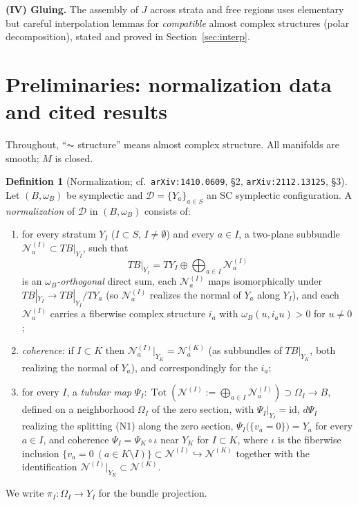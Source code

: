 \documentclass[11pt]{amsart}
\theoremstyle{plain}
\theoremstyle{definition}
\newtheorem{definition}[theorem]{Definition}
\newcommand{\NN}{\mathcal{N}}
\newcommand{\DD}{\mathcal{D}}
\newcommand{\tot}{\operatorname{Tot}}
\begin{document}
\smallskip
\noindent\textbf{(IV) Gluing.} The assembly of $J$ across strata and free
regions uses elementary but careful interpolation lemmas for \emph{compatible}
almost complex structures (polar decomposition), stated and proved in
Section~\ref{sec:interp}.

\section{Preliminaries: normalization data and cited results}

Throughout, ``$\AC$ structure'' means almost complex structure. All manifolds
are smooth; $M$ is closed.

\begin{definition}[Normalization; cf.\ \texttt{arXiv:1410.0609}, \S2,
\texttt{arXiv:2112.13125}, \S3]\label{def:norm}
Let $(B,\omega_B)$ be symplectic and $\DD=\{Y_a\}_{a\in S}$ an SC symplectic
configuration. A \emph{normalization} of $\DD$ in $(B,\omega_B)$ consists of:
\begin{enumerate}
\item[(N1)] for every stratum $Y_I$ ($I\subset S$, $I\neq\emptyset$) and every
$a\in I$, a two-plane subbundle $\NN_a^{(I)}\subset TB|_{Y_I}$, such that
\[
 TB|_{Y_I}=TY_I\oplus\bigoplus_{a\in I}\NN_a^{(I)}
\]
is an \emph{$\omega_B$-orthogonal} direct sum, each $\NN_a^{(I)}$ maps
isomorphically under $TB|_{Y_I}\to TB|_{Y_I}/TY_a$ (so $\NN_a^{(I)}$ realizes
the normal of $Y_a$ along $Y_I$), and each $\NN_a^{(I)}$ carries a fiberwise
complex structure $i_a$ with $\omega_B(u,i_a u)>0$ for $u\neq0$;
\item[(N2)] \emph{coherence}: if $I\subset K$ then
$\NN_a^{(I)}|_{Y_K}=\NN_a^{(K)}$ (as subbundles of $TB|_{Y_K}$, both realizing
the normal of $Y_a$), and correspondingly for the $i_a$;
\item[(N3)] for every $I$, a \emph{tubular map}
$\Psi_I:\tot(\NN^{(I)}:=\bigoplus_{a\in I}\NN_a^{(I)})\supset\Omega_I\to B$,
defined on a neighborhood $\Omega_I$ of the zero section, with
$\Psi_I|_{Y_I}=\mathrm{id}$, $d\Psi_I$ realizing the splitting (N1) along the
zero section, $\Psi_I\bigl(\{v_a=0\}\bigr)=Y_a$ for every $a\in I$, and
coherence $\Psi_I=\Psi_K\circ\iota$ near $Y_K$ for $I\subset K$, where
$\iota$ is the fiberwise inclusion
$\{v_a=0\ (a\in K\setminus I)\}\subset\NN^{(I)}\hookrightarrow\NN^{(K)}$
together with the identification $\NN^{(I)}|_{Y_K}\subset\NN^{(K)}$.
\end{enumerate}
We write $\pi_I:\Omega_I\to Y_I$ for the bundle projection.
\end{definition}
\end{document}
